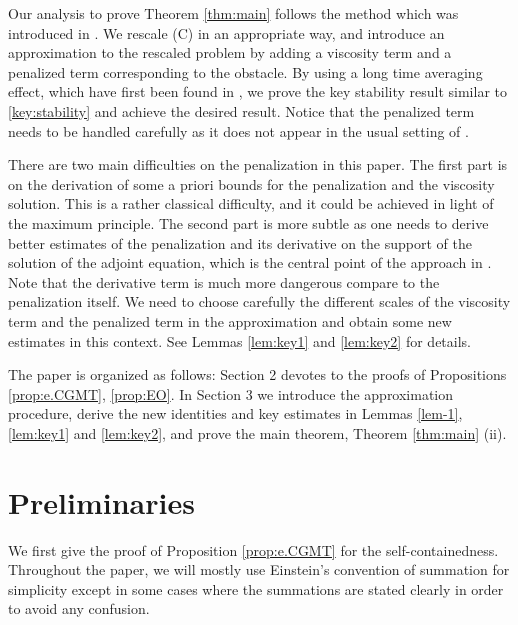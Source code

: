 \documentclass[12pt,reqno]{amsart}
\theoremstyle{plain}
\theoremstyle{remark}
\numberwithin{equation}{section}
\begin{document}
Our analysis  to prove Theorem \ref{thm:main} follows the method which was introduced in \cite{CGMT}. 
We rescale (C) in an appropriate way, and introduce an approximation to the rescaled problem by adding a viscosity term and 
a penalized term corresponding to the obstacle. 
By using a long time averaging effect, which have first been found in \cite{CGMT}, 
we prove the key stability result  similar to \eqref{key:stability} and achieve the desired result. 
Notice that the penalized term needs to be handled carefully as it does not appear in the usual setting of \cite{CGMT}. 

There are two main difficulties on the penalization in this paper. The first part is on the derivation of some a priori bounds for the penalization and the viscosity solution.
This is a rather classical difficulty, and it could be achieved in light of the maximum principle.
The second part is more subtle as one needs to derive better estimates of the penalization
and its derivative on the support 
of the solution of the adjoint equation, which is the central point of the approach in \cite{CGMT}.
Note that the derivative term is much more dangerous compare to the penalization itself.
We need to choose carefully the different scales of the viscosity term and the penalized term in the approximation 
and obtain some new estimates in this context. See Lemmas \ref{lem:key1} and \ref{lem:key2} for details.

\medskip
The paper is organized as follows: Section 2 devotes to the proofs of  Propositions \ref{prop:e.CGMT}, 
\ref{prop:EO}. 
In Section 3 we introduce the approximation procedure,
derive the new identities and key estimates in Lemmas \ref{lem-1}, \ref{lem:key1} and \ref{lem:key2}, and prove the main theorem, Theorem \ref{thm:main} (ii). 

\section{Preliminaries}
We first give the proof of Proposition \ref{prop:e.CGMT}  
for the self-containedness. 
Throughout the paper, we will mostly use Einstein's convention of summation for simplicity except in some cases where the summations are stated clearly in order to avoid any confusion.
\end{document}
